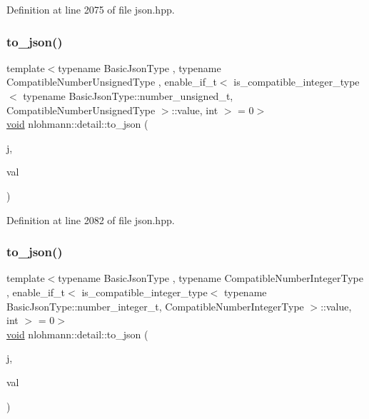Definition at line 2075 of file json.\+hpp.

\mbox{\label{namespacenlohmann_1_1detail_ae5fd66b5517b3b5a6c6b9fd9f29ba8dc}} 
\subsubsection{\texorpdfstring{to\_json()}{to\_json()}\hspace{0.1cm}{\footnotesize\ttfamily [5/17]}}
{\footnotesize\ttfamily template$<$typename Basic\+Json\+Type , typename Compatible\+Number\+Unsigned\+Type , enable\+\_\+if\+\_\+t$<$ is\+\_\+compatible\+\_\+integer\+\_\+type$<$ typename Basic\+Json\+Type\+::number\+\_\+unsigned\+\_\+t, Compatible\+Number\+Unsigned\+Type $>$\+::value, int $>$  = 0$>$ \\
\mbox{\hyperlink{namespacenlohmann_1_1detail_a59fca69799f6b9e366710cb9043aa77d}{void}} nlohmann\+::detail\+::to\+\_\+json (\begin{DoxyParamCaption}\item[{Basic\+Json\+Type \&}]{j,  }\item[{Compatible\+Number\+Unsigned\+Type}]{val }\end{DoxyParamCaption})\hspace{0.3cm}{\ttfamily [noexcept]}}



Definition at line 2082 of file json.\+hpp.

\mbox{\label{namespacenlohmann_1_1detail_a91fe576be579c8c2fdd14610605c6dd2}} 
\subsubsection{\texorpdfstring{to\_json()}{to\_json()}\hspace{0.1cm}{\footnotesize\ttfamily [6/17]}}
{\footnotesize\ttfamily template$<$typename Basic\+Json\+Type , typename Compatible\+Number\+Integer\+Type , enable\+\_\+if\+\_\+t$<$ is\+\_\+compatible\+\_\+integer\+\_\+type$<$ typename Basic\+Json\+Type\+::number\+\_\+integer\+\_\+t, Compatible\+Number\+Integer\+Type $>$\+::value, int $>$  = 0$>$ \\
\mbox{\hyperlink{namespacenlohmann_1_1detail_a59fca69799f6b9e366710cb9043aa77d}{void}} nlohmann\+::detail\+::to\+\_\+json (\begin{DoxyParamCaption}\item[{Basic\+Json\+Type \&}]{j,  }\item[{Compatible\+Number\+Integer\+Type}]{val }\end{DoxyParamCaption})\hspace{0.3cm}{\ttfamily [noexcept]}}



